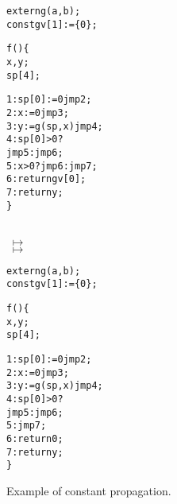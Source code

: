 
\begin{figure}
\noindent
\begin{minipage}{0.5\columnwidth}
\begin{alltt}
extern g(a,b);
const gv[1] := \{ 0 \};

f() \{
  x, y;
  sp[4];

1: sp[0] := 0 jmp 2;
2: x := 0 jmp 3;
3: y := g(sp,x) jmp 4;
4: sp[0] > 0 ? 
     jmp 5 : jmp 6;
5: x > 0 ? jmp 6 : jmp 7;
6: return gv[0];
7: return y;
\}
\end{alltt}
\end{minipage}
\begin{minipage}{0.05\columnwidth}
\mbox{}\\[3.65cm]
$\;\mapsto$\\
$\;\mapsto$\\
\end{minipage}
\begin{minipage}{0.4\columnwidth}
\begin{alltt}
 extern g(a,b);
 const gv[1] := \{ 0 \};
 
 f() \{
   x, y;
   sp[4];
 
 1: sp[0] := 0 jmp 2;
 2: x := 0 jmp 3;
 3: y := g(sp,x) jmp 4;
 4: sp[0] > 0 ? 
      jmp 5 : jmp 6;
 {\color{red}5: jmp 7;}
 {\color{red}6: return 0;}
 7: return y;
 \}
\end{alltt}
\end{minipage}
\caption{Example of constant propagation.}
\label{fig:const-prop-example}
\end{figure}


